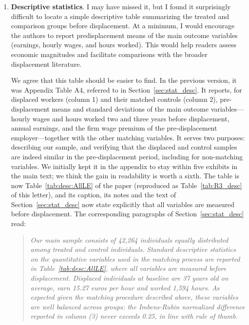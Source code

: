 \documentclass[11pt]{article}
\newcommand{\comment}[1]{\begingroup #1\endgroup}
\newcommand{\answer}[1]{\begingroup\color{navy}#1\endgroup}
\begin{document}
\begin{enumerate}[leftmargin=*]
\item[1.] 
\comment{\textbf{Descriptive statistics}. I may have missed it, but I found it surprisingly difficult to locate a simple descriptive table summarizing the treated and comparison groups before displacement. At a minimum, I would encourage the authors to report predisplacement means of the main outcome variables (earnings, hourly wages, and hours worked). This would help readers assess economic magnitudes and facilitate comparisons with the broader displacement literature.
}\par

\answer{We agree that this table should be easier to find. In the previous version, it was Appendix Table A4, referred to in Section~\ref{sec:stat_desc}. It reports, for displaced workers (column 1) and their matched controls (column 2), pre-displacement means and standard deviations of the main outcome variables---hourly wages and hours worked two and three years before displacement, annual earnings, and the firm wage premium of the pre-displacement employer---together with the other matching variables. It serves two purposes: describing our sample, and verifying that the displaced and control samples are indeed similar in the pre-displacement period, including for non-matching variables. We initially kept it in the appendix to stay within five exhibits in the main text; we think the gain in readability is worth a sixth. The table is now Table~\ref{tab:desc:AllLE} of the paper (reproduced as Table~\ref{tab:R3_desc} of this letter), and its caption, its notes and the text of Section~\ref{sec:stat_desc} now state explicitly that all variables are measured before displacement. The corresponding paragraphs of Section~\ref{sec:stat_desc} read:
\begin{quote}\itshape
Our main sample consists of 42,264 individuals equally distributed among treated and control individuals. Standard descriptive statistics on the quantitative variables used in the matching process are reported in Table~\ref{tab:desc:AllLE}, where all variables are measured before displacement. Displaced individuals at baseline are 37 years old on average, earn 15.27 euros per hour and worked 1,594 hours. As expected given the matching procedure described above, these variables are well balanced across groups: the Imbens-Rubin normalized difference reported in column (3) never exceeds 0.25, in line with \citet{rubin_assessing_2015} rule of thumb.


\end{quote}}
\end{enumerate}
\end{document}
